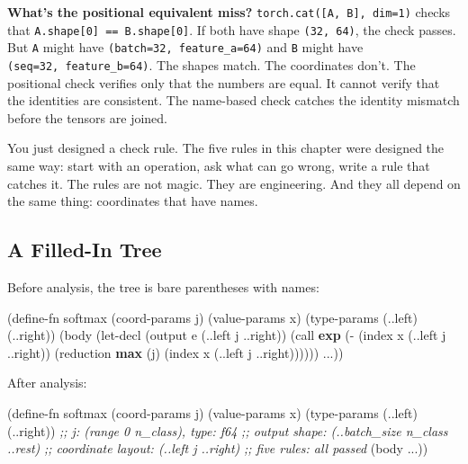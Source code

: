 \documentclass[11pt,titlepage]{article}
\newenvironment{Shaded}{}{}
\newcommand{\CommentTok}[1]{\textcolor[rgb]{0.38,0.63,0.69}{\textit{#1}}}
\newcommand{\KeywordTok}[1]{\textcolor[rgb]{0.00,0.44,0.13}{\textbf{#1}}}
\newcommand{\NormalTok}[1]{#1}
\newcommand{\OperatorTok}[1]{\textcolor[rgb]{0.40,0.40,0.40}{#1}}
\begin{document}
\textbf{What's the positional equivalent miss?}
\texttt{torch.cat({[}A,\ B{]},\ dim=1)} checks that
\texttt{A.shape{[}0{]}\ ==\ B.shape{[}0{]}}. If both have shape
\texttt{(32,\ 64)}, the check passes. But \texttt{A} might have
\texttt{(batch=32,\ feature\_a=64)} and \texttt{B} might have
\texttt{(seq=32,\ feature\_b=64)}. The shapes match. The coordinates
don't. The positional check verifies only that the numbers are equal. It
cannot verify that the identities are consistent. The name-based check
catches the identity mismatch before the tensors are joined.

\vspace{2em}

You just designed a check rule. The five rules in this chapter were
designed the same way: start with an operation, ask what can go wrong,
write a rule that catches it. The rules are not magic. They are
engineering. And they all depend on the same thing: coordinates that
have names.

\vspace{2em}

\hypertarget{a-filled-in-tree}{%
\subsection{A Filled-In Tree}\label{a-filled-in-tree}}

Before analysis, the tree is bare parentheses with names:

\begin{Shaded}
\begin{Highlighting}[]
\NormalTok{(define-fn softmax (coord-params j) (value-params x)}
\NormalTok{  (type-params (..left) (..right))}
\NormalTok{  (body}
\NormalTok{    (let-decl (output e (..left j ..right))}
\NormalTok{      (call }\KeywordTok{exp}\NormalTok{ (}\OperatorTok{-}\NormalTok{ (index x (..left j ..right))}
\NormalTok{                   (reduction }\KeywordTok{max}\NormalTok{ (j)}
\NormalTok{                     (index x (..left j ..right))))))}
\NormalTok{    ...))}
\end{Highlighting}
\end{Shaded}

After analysis:

\begin{Shaded}
\begin{Highlighting}[]
\NormalTok{(define-fn softmax (coord-params j) (value-params x)}
\NormalTok{  (type-params (..left) (..right))}
  \CommentTok{;; j: (range 0 n_class), type: f64}
  \CommentTok{;; output shape: (..batch_size n_class ..rest)}
  \CommentTok{;; coordinate layout: (..left j ..right)}
  \CommentTok{;; five rules: all passed}
\NormalTok{  (body ...))}
\end{Highlighting}
\end{Shaded}
\end{document}
